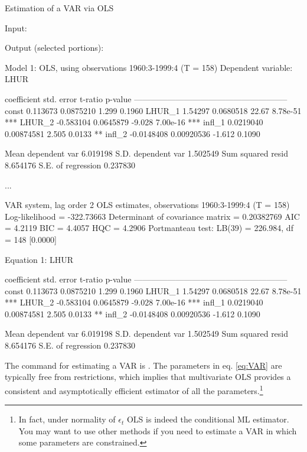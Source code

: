 \begin{script}[htbp]
  \caption{Estimation of a VAR via OLS}
  \label{script:var-ols}
Input:
Output (selected portions):
\begin{scodebit}
Model 1: OLS, using observations 1960:3-1999:4 (T = 158)
Dependent variable: LHUR

             coefficient   std. error   t-ratio   p-value 
  --------------------------------------------------------
  const       0.113673     0.0875210     1.299    0.1960  
  LHUR_1      1.54297      0.0680518    22.67     8.78e-51 ***
  LHUR_2     -0.583104     0.0645879    -9.028    7.00e-16 ***
  infl_1      0.0219040    0.00874581    2.505    0.0133   **
  infl_2     -0.0148408    0.00920536   -1.612    0.1090  

Mean dependent var   6.019198   S.D. dependent var   1.502549
Sum squared resid    8.654176   S.E. of regression   0.237830

...


VAR system, lag order 2
OLS estimates, observations 1960:3-1999:4 (T = 158)
Log-likelihood = -322.73663
Determinant of covariance matrix = 0.20382769
AIC = 4.2119
BIC = 4.4057
HQC = 4.2906
Portmanteau test: LB(39) = 226.984, df = 148 [0.0000]

Equation 1: LHUR

             coefficient   std. error   t-ratio   p-value 
  --------------------------------------------------------
  const       0.113673     0.0875210     1.299    0.1960  
  LHUR_1      1.54297      0.0680518    22.67     8.78e-51 ***
  LHUR_2     -0.583104     0.0645879    -9.028    7.00e-16 ***
  infl_1      0.0219040    0.00874581    2.505    0.0133   **
  infl_2     -0.0148408    0.00920536   -1.612    0.1090  

Mean dependent var   6.019198   S.D. dependent var   1.502549
Sum squared resid    8.654176   S.E. of regression   0.237830
\end{scodebit}
\end{script}

The  command for estimating a VAR is . The
parameters in eq. \eqref{eq:VAR} are typically free from restrictions,
which implies that multivariate OLS provides a consistent and
asymptotically efficient estimator of all the parameters.\footnote{In
  fact, under normality of $\epsilon_t$ OLS is indeed the conditional
  ML estimator. You may want to use other methods if you need to
  estimate a VAR in which some parameters are constrained.}

